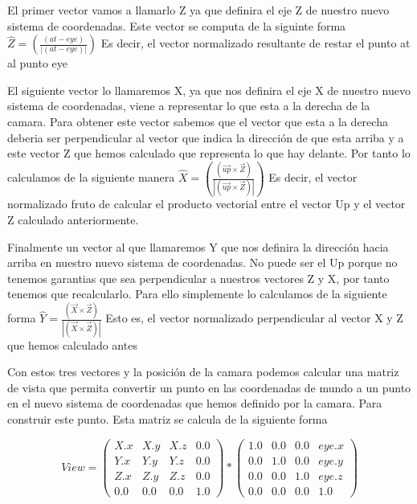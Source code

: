 \begin{list}{.}{}
\item El primer vector vamos a llamarlo Z ya que definira el eje Z de nuestro nuevo sistema de coordenadas. Este vector
se computa de la siguinte forma $\hat{Z}=(\frac{({at}-{eye})}{|({at}-{eye})|})$ Es decir, el vector normalizado resultante de restar el punto at al punto eye
\item El siguiente vector lo llamaremos X, ya que nos definira el eje X de nuestro nuevo sistema de coordenadas, viene a representar lo que esta a la derecha de la camara. Para obtener este vector sabemos que el vector que esta a la derecha deberia ser perpendicular al vector que indica la dirección de que esta arriba y a este vector Z
que hemos calculado que representa lo que hay delante. Por tanto lo calculamos de la siguiente manera $\hat{X}=(\frac{(\vec{up} \times \vec{Z})}{|(\vec{up} \times \vec{Z})|})$ Es decir, el vector normalizado fruto de calcular el producto vectorial entre el vector Up y el vector Z calculado anteriormente.
\item Finalmente un vector al que llamaremos Y que nos definira la dirección hacia arriba en nuestro nuevo sistema de coordenadas. No puede ser el Up porque no tenemos garantias que sea perpendicular a nuestros vectores Z y X, por tanto tenemos que recalcularlo. Para ello simplemente lo calculamos de la siguiente forma $\hat{Y}=\frac{(\vec{X} \times \vec{Z})}{|(\vec{X} \times \vec{Z})|}$ Esto es, el vector normalizado perpendicular al vector X y Z que hemos calculado antes
\end{list}

Con estos tres vectores y la posición de la camara podemos calcular una matriz de vista que permita convertir un punto en las coordenadas de mundo a un punto en el nuevo sistema de coordenadas que hemos definido por la camara. Para construir este punto. Esta matriz se calcula de la siguiente forma \cite{learnopenglLearnOpenGLCamera}

$$ {View}=  \begin{pmatrix}
    X.x & X.y & X.z & 0.0 \\
    Y.x & Y.y & Y.z & 0.0 \\
    Z.x & Z.y & Z.z & 0.0 \\
    0.0 & 0.0 & 0.0 & 1.0 
    \end{pmatrix} *  \begin{pmatrix}
        1.0 & 0.0 & 0.0 & {eye.x} \\
        0.0 & 1.0 & 0.0 & {eye.y} \\
        0.0 & 0.0 & 1.0 & {eye.z} \\
        0.0 & 0.0 & 0.0 & 1.0 
        \end{pmatrix}  $$ 

